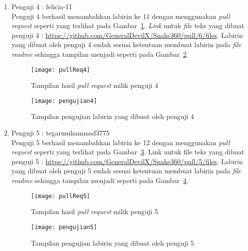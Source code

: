\begin{enumerate}
	\item Penguji 4 : felicia-11\\
	Penguji 4 berhasil menambahkan labirin ke 11 dengan menggunakan \textit{pull request} seperti yang terlihat pada Gambar~\ref{fig:pullReq4}. \textit{Link} untuk \textit{file} teks yang dibuat penguji 4 : \url{https://github.com/GeneralDevilX/Snake360/pull/6/files}. Labirin yang dibuat oleh penguji 4 sudah sesuai ketentuan membuat labirin pada \textit{file readme} sehingga tampilan menjadi seperti pada Gambar~\ref{fig:pengujian4}.
	
	\begin{figure}[H]
		\centering  
		\texttt{[image: pullReq4]}  
		\caption[Tampilan hasil \textit{pull request} milik penguji 4]{Tampilan hasil \textit{pull request} milik penguji 4}
		\label{fig:pullReq4} 
	\end{figure}
	
	\begin{figure}[H]
		\centering  
		\texttt{[image: pengujian4]}  
		\caption[Tampilan pengujian labirin yang dibuat oleh penguji 4]{Tampilan pengujian labirin yang dibuat oleh penguji 4}
		\label{fig:pengujian4} 
	\end{figure}
	
	\item Penguji 5 : tegarmuhammad3775\\
	Penguji 5 berhasil menambahkan labirin ke 12 dengan menggunakan \textit{pull request} seperti yang terlihat pada Gambar~\ref{fig:pullReq5}. Link untuk file teks yang dibuat penguji 5 : \url{https://github.com/GeneralDevilX/Snake360/pull/5/files}. Labirin yang dibuat oleh penguji 5 sudah sesuai ketentuan membuat labirin pada \textit{file readme} sehingga tampilan menjadi seperti pada Gambar~\ref{fig:pengujian5}.
	
	\begin{figure}[H]
		\centering  
		\texttt{[image: pullReq5]}  
		\caption[Tampilan hasil \textit{pull request} milik penguji 5]{Tampilan hasil \textit{pull request} milik penguji 5}
		\label{fig:pullReq5} 
	\end{figure}
	
	\begin{figure}[H]
		\centering  
		\texttt{[image: pengujian5]}  
		\caption[Tampilan pengujian labirin yang dibuat oleh penguji 5]{Tampilan pengujian labirin yang dibuat oleh penguji 5}
		\label{fig:pengujian5} 
	\end{figure}
\end{enumerate}